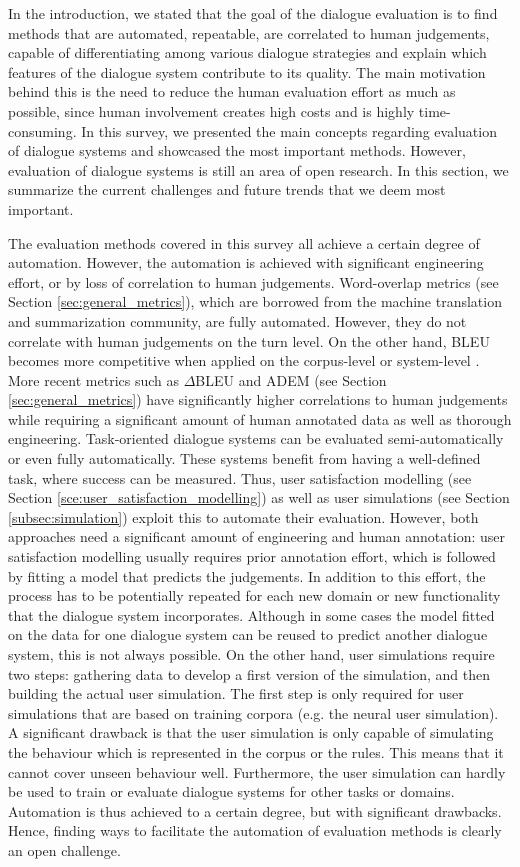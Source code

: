 \label{sec:discussion}
In the introduction, we stated  that the goal of the dialogue evaluation is to find methods that are automated, repeatable, are correlated to human judgements, capable of differentiating among various dialogue strategies and explain which features of the dialogue system contribute to its quality. The main motivation behind this is the need to reduce the human evaluation effort as much as possible, since human involvement creates high costs and is highly time-consuming. In this survey, we presented the main concepts regarding evaluation of dialogue systems and showcased the most important methods. However, evaluation of dialogue systems is still an area of open  research. In this section, we summarize the current challenges and future trends that we deem most important.

The evaluation methods covered in this survey all achieve a certain degree of automation. However, the automation is achieved with significant engineering effort, or by loss of correlation to human judgements.
Word-overlap metrics (see Section \ref{sec:general_metrics}), which are borrowed from the machine translation and summarization community, are fully automated. However, they do not correlate with human judgements on the turn level. On the other hand, BLEU becomes more competitive when applied on the corpus-level or system-level . More recent metrics such as $\Delta$BLEU and ADEM (see Section \ref{sec:general_metrics}) have significantly higher correlations to human judgements while requiring a significant amount of human annotated data as well as thorough engineering.  
Task-oriented dialogue systems can be evaluated semi-automatically or even fully automatically. These systems benefit from having a well-defined task, where success can be measured. Thus, user satisfaction modelling (see Section \ref{sce:user_satisfaction_modelling}) as well as user simulations (see Section \ref{subsec:simulation}) exploit this to automate their evaluation. However, both approaches need a significant amount of engineering and human annotation: user satisfaction modelling usually requires prior annotation effort, which is followed by fitting a model that predicts the judgements. In addition to this effort, the process has to be potentially repeated for each new domain or new functionality that the dialogue system incorporates. Although in some cases the model fitted on the data for one dialogue system can be reused to predict another dialogue system, this is not always possible. 
On the other hand, user simulations require two steps: gathering data to develop a first version of the simulation, and then building the actual user simulation. The first step is only required for user simulations that are based on training corpora (e.g. the neural user simulation). A significant drawback is that the user simulation is only capable of simulating the behaviour which is represented in the corpus or the rules. This means that it cannot cover unseen behaviour well. Furthermore, the user simulation can hardly be used to train or evaluate dialogue systems for other tasks or domains. 
Automation is thus achieved to a certain degree, but with significant drawbacks. Hence, finding ways to facilitate the automation of evaluation methods is clearly an open challenge.

